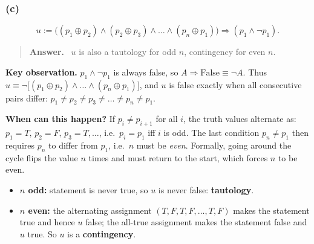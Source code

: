 \documentclass[11pt,a4paper]{article}
\newenvironment{answerbox}[1][Answer]{\par\smallskip\begin{quote}\textbf{#1.}\ }{\end{quote}}
\theoremstyle{definition}
\begin{document}

\subsubsection{(c)}
\[
u:=\big((p_1\oplus p_2)\wedge(p_2\oplus p_3)\wedge\dots\wedge(p_n\oplus p_1)\big)\Rightarrow(p_1\wedge\neg p_1).
\]

\begin{answerbox}[Answer]
$u$ is also a tautology for odd $n$, contingency for even $n$.
\end{answerbox}
\textbf{Key observation.} $p_1\wedge\neg p_1$ is always false, so $A\Rightarrow\text{False}\equiv\neg A$. Thus
$u\equiv\neg\big[(p_1\oplus p_2)\wedge\dots\wedge(p_n\oplus p_1)\big]$, and $u$ is false exactly when all consecutive pairs differ: $p_1\ne p_2\ne p_3\ne\dots\ne p_n\ne p_1$.

\textbf{When can this happen?} If $p_i\neq p_{i+1}$ for all $i$, the truth values alternate as: $p_1=T,\,p_2=F,\,p_3=T,\dots$, i.e.\ $p_i=p_1$ iff $i$ is odd. 
The last condition $p_n\neq p_1$ then requires $p_n$ to differ from $p_1$, i.e.\ $n$ must be \emph{even}. Formally, going around the cycle flips the value $n$ times and must return to the start, which forces $n$ to be even.
\begin{itemize}
  \item \textbf{$n$ odd:} statement is never true, so $u$ is never false: \textbf{tautology}.
  \item \textbf{$n$ even:} the alternating assignment $(T,F,T,F,\dots,T,F)$ makes the statement true and hence $u$ false; the all-true assignment makes the statement false and $u$ true. So $u$ is a \textbf{contingency}.
\end{itemize}













\section{}

\end{document}
